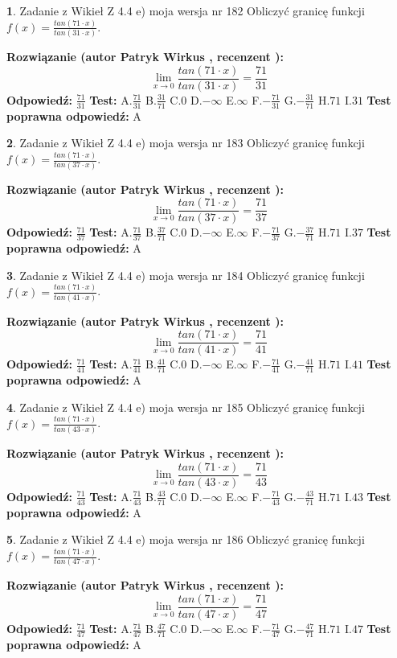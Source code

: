 \documentclass[12pt, a4paper]{article}
\theoremstyle{definition} %
\newtheorem{zad}{}
\newcommand{\zadStart}[1]{\begin{zad}#1\newline}
\newcommand{\zadStop}{\end{zad}}
\newcommand{\rozwStart}[2]{\noindent \textbf{Rozwiązanie (autor #1 , recenzent #2): }\newline}
\newcommand{\rozwStop}{\newline}
\newcommand{\odpStart}{\noindent \textbf{Odpowiedź:}\newline}
\newcommand{\odpStop}{\newline}
\newcommand{\testStart}{\noindent \textbf{Test:}\newline}
\newcommand{\testStop}{\newline}
\newcommand{\kluczStart}{\noindent \textbf{Test poprawna odpowiedź:}\newline}
\newcommand{\kluczStop}{\newline}
\begin{document}
\zadStart{Zadanie z Wikieł Z 4.4 e) moja wersja nr 182}
Obliczyć granicę funkcji $f(x)=\frac{tan(71\cdot x)}{tan(31\cdot x)}$.
\zadStop
\rozwStart{Patryk Wirkus}{}
$$\lim\limits_{x\to 0}\frac{tan(71\cdot x)}{tan(31\cdot x)}=
\frac{71}{31}$$
\rozwStop
\odpStart
$\frac{71}{31}$
\odpStop
\testStart
A.$\frac{71}{31}$
B.$\frac{31}{71}$
C.$0$
D.$-\infty$
E.$\infty$
F.$-\frac{71}{31}$
G.$-\frac{31}{71}$
H.$71$
I.$31$
\testStop
\kluczStart
A
\kluczStop



\zadStart{Zadanie z Wikieł Z 4.4 e) moja wersja nr 183}
Obliczyć granicę funkcji $f(x)=\frac{tan(71\cdot x)}{tan(37\cdot x)}$.
\zadStop
\rozwStart{Patryk Wirkus}{}
$$\lim\limits_{x\to 0}\frac{tan(71\cdot x)}{tan(37\cdot x)}=
\frac{71}{37}$$
\rozwStop
\odpStart
$\frac{71}{37}$
\odpStop
\testStart
A.$\frac{71}{37}$
B.$\frac{37}{71}$
C.$0$
D.$-\infty$
E.$\infty$
F.$-\frac{71}{37}$
G.$-\frac{37}{71}$
H.$71$
I.$37$
\testStop
\kluczStart
A
\kluczStop



\zadStart{Zadanie z Wikieł Z 4.4 e) moja wersja nr 184}
Obliczyć granicę funkcji $f(x)=\frac{tan(71\cdot x)}{tan(41\cdot x)}$.
\zadStop
\rozwStart{Patryk Wirkus}{}
$$\lim\limits_{x\to 0}\frac{tan(71\cdot x)}{tan(41\cdot x)}=
\frac{71}{41}$$
\rozwStop
\odpStart
$\frac{71}{41}$
\odpStop
\testStart
A.$\frac{71}{41}$
B.$\frac{41}{71}$
C.$0$
D.$-\infty$
E.$\infty$
F.$-\frac{71}{41}$
G.$-\frac{41}{71}$
H.$71$
I.$41$
\testStop
\kluczStart
A
\kluczStop



\zadStart{Zadanie z Wikieł Z 4.4 e) moja wersja nr 185}
Obliczyć granicę funkcji $f(x)=\frac{tan(71\cdot x)}{tan(43\cdot x)}$.
\zadStop
\rozwStart{Patryk Wirkus}{}
$$\lim\limits_{x\to 0}\frac{tan(71\cdot x)}{tan(43\cdot x)}=
\frac{71}{43}$$
\rozwStop
\odpStart
$\frac{71}{43}$
\odpStop
\testStart
A.$\frac{71}{43}$
B.$\frac{43}{71}$
C.$0$
D.$-\infty$
E.$\infty$
F.$-\frac{71}{43}$
G.$-\frac{43}{71}$
H.$71$
I.$43$
\testStop
\kluczStart
A
\kluczStop



\zadStart{Zadanie z Wikieł Z 4.4 e) moja wersja nr 186}
Obliczyć granicę funkcji $f(x)=\frac{tan(71\cdot x)}{tan(47\cdot x)}$.
\zadStop
\rozwStart{Patryk Wirkus}{}
$$\lim\limits_{x\to 0}\frac{tan(71\cdot x)}{tan(47\cdot x)}=
\frac{71}{47}$$
\rozwStop
\odpStart
$\frac{71}{47}$
\odpStop
\testStart
A.$\frac{71}{47}$
B.$\frac{47}{71}$
C.$0$
D.$-\infty$
E.$\infty$
F.$-\frac{71}{47}$
G.$-\frac{47}{71}$
H.$71$
I.$47$
\testStop
\kluczStart
A
\kluczStop
\end{document}
